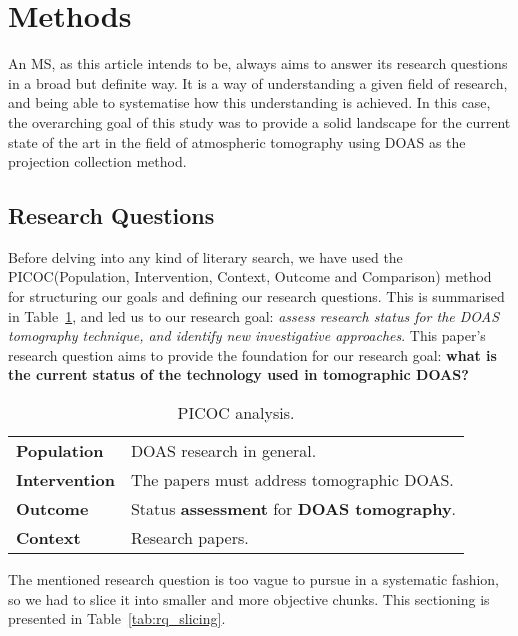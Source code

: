 
\section{Methods}\label{sec:methods}

An MS, as this article intends to be, always aims to answer its research
questions in a broad but definite way. It is a way of understanding a
given field of research, and being able to systematise how this
understanding is achieved. In this case, the overarching goal of this
study was to provide a solid landscape for the current state of the art
in the field of atmospheric tomography using DOAS as the projection
collection method.

\subsection{Research Questions}
\label{sub:research_questions_and_search_queries}

Before delving into any kind of literary search, we have used the
PICOC(Population, Intervention, Context, Outcome and Comparison) method
for structuring our goals and defining our research questions. This is
summarised in Table~\ref{tab:picoc}, and led us to our research goal:
\textit{assess research status for the DOAS tomography technique, and
identify new investigative approaches}. This paper's research question
aims to provide the foundation for our research goal: \textbf{what is
the current status of the technology used in tomographic DOAS?}
    
\begin{table}[htb]
\small
\centering
\caption{PICOC analysis.}
\label{tab:picoc}
\begin{tabular}{@{}ll@{}}
\toprule
\textbf{Population} & DOAS research in general.\\ 
\textbf{Intervention} & The papers must address tomographic DOAS.\\
\textbf{Outcome} & Status \textbf{assessment} for \textbf{DOAS tomography}.\\
\textbf{Context} & Research papers.\\\bottomrule
\end{tabular}
\end{table}

The mentioned research question is too vague to pursue in a systematic
fashion, so we had to slice it into smaller and more objective chunks.
This sectioning is presented in Table~\ref{tab:rq_slicing}.

